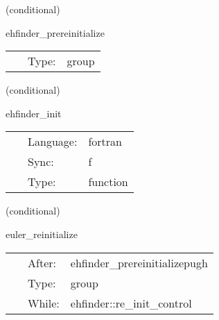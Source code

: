    (conditional) 

\hspace{5mm} ehfinder\_prereinitialize 

\hspace{5mm}{\it pugh version of the pre-re-initialization routines } 


\hspace{5mm}

 \begin{tabular*}{160mm}{cll} 
~ & Type:  & group \\ 
\end{tabular*} 


\vspace{5mm}

   (conditional) 

\hspace{5mm} ehfinder\_init 

\hspace{5mm}{\it setup local variables } 


\hspace{5mm}

 \begin{tabular*}{160mm}{cll} 
~ & Language:  & fortran \\ 
~ & Sync:  & f \\ 
~ & Type:  & function \\ 
\end{tabular*} 


\vspace{5mm}

   (conditional) 

\hspace{5mm} euler\_reinitialize 

\hspace{5mm}{\it schedule group for euler re-initialization } 


\hspace{5mm}

 \begin{tabular*}{160mm}{cll} 
~ & After:  & ehfinder\_prereinitializepugh \\ 
~ & Type:  & group \\ 
~ & While:  & ehfinder::re\_init\_control \\ 
\end{tabular*} 


\vspace{5mm}

